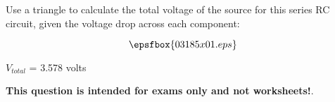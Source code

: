 

Use a triangle to calculate the total voltage of the source for this series RC circuit, given the voltage drop across each component:

$$\epsfbox{03185x01.eps}$$







$V_{total}$ = 3.578 volts







{\bf This question is intended for exams only and not worksheets!}.





